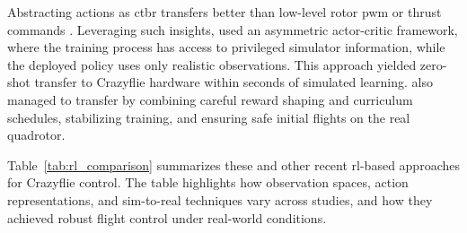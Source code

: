 Abstracting actions as \gls{ctbr} transfers better than low-level rotor \gls{pwm} or thrust commands \cite{kaufmann_benchmark_2022}. Leveraging such insights, \cite{Eschmann2024} used an asymmetric actor-critic framework, where the training process has access to privileged simulator information, while the deployed policy uses only realistic observations. This approach yielded zero-shot transfer to Crazyflie hardware within seconds of simulated learning. \cite{chen_what_2024} also managed to transfer by combining careful reward shaping and curriculum schedules, stabilizing training, and ensuring safe initial flights on the real quadrotor.

Table~\ref{tab:rl_comparison} summarizes these and other recent \gls{rl}-based approaches for Crazyflie control. The table highlights how observation spaces, action representations, and sim-to-real techniques vary across studies, and how they achieved robust flight control under real-world conditions.
